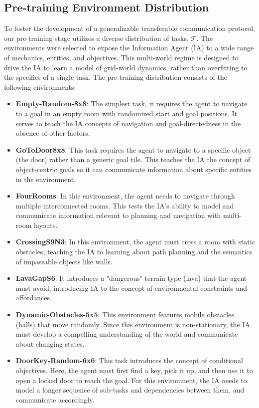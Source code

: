 \documentclass[letterpaper]{article}
\begin{document}
\begin{appendix}
\subsection{Pre-training Environment Distribution}
To foster the development of a generalizable transferable communication protocol, our pre-training stage utilizes a diverse distribution of tasks, $\mathcal{T}$. The environments were selected to expose the Information Agent (IA) to a wide range of mechanics, entities, and objectives. This multi-world regime is designed to drive the IA to learn a model of grid-world dynamics, rather than overfitting to the specifics of a single task. The pre-training distribution consists of the following environments:
\begin{itemize}
    \item \textbf{Empty-Random-8x8}: The simplest task, it requires the agent to navigate to a goal in an empty room with randomized start and goal positions. It serves to teach the IA concepts of navigation and goal-directedness in the absence of other factors.
    \item \textbf{GoToDoor8x8}: This task requires the agent to navigate to a specific object (the door) rather than a generic goal tile. This teaches the IA the concept of object-centric goals so it can communicate information about specific entities in the environment.
    \item \textbf{FourRooms}: In this environment, the agent needs to navigate through multiple interconnected rooms. This tests the IA's ability to model and communicate information relevant to planning and navigation with multi-room layouts.
    \item \textbf{CrossingS9N3}: In this environment, the agent must cross a room with static obstacles, teaching the IA to learning about path planning and the semantics of impassable objects like walls.
    \item \textbf{LavaGapS6}: It introduces a "dangerous" terrain type (lava) that the agent must avoid, introducing IA to the concept of environmental constraints and affordances.
    \item \textbf{Dynamic-Obstacles-5x5}: This environment features mobile obstacles (balls) that move randomly. Since this environment is non-stationary, the IA must develop a compelling understanding of the world and communicate about changing states.
    \item \textbf{DoorKey-Random-6x6}: This task introduces the concept of conditional objectives. Here, the agent must first find a key, pick it up, and then use it to open a locked door to reach the goal. For this environment, the IA needs to model a longer sequence of sub-tasks and dependencies between them, and communicate accordingly.
\end{itemize}

\end{appendix}
\end{document}
